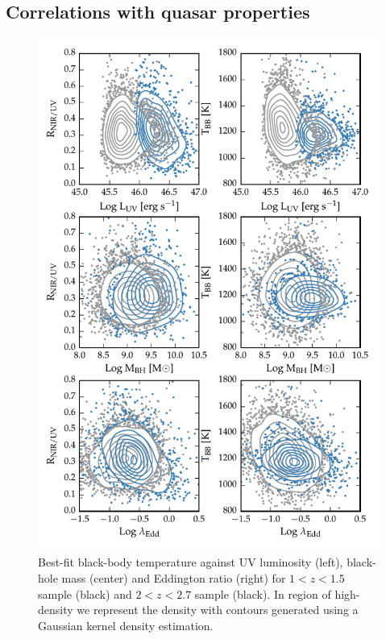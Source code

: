 \subsection{Correlations with quasar properties}

\begin{figure}
  \centering
  \includegraphics[width=\textwidth]{figures/chapter05/correlations_contour.pdf}
  \caption{Best-fit black-body temperature against UV luminosity (left), black-hole mass (center) and Eddington ratio (right) for $1 < z < 1.5$ sample (black) and $2 < z < 2.7$ sample (black). In region of high-density we represent the density with contours generated using a Gaussian kernel density estimation. }
  \label{fig:correlations_contour}
\end{figure}


